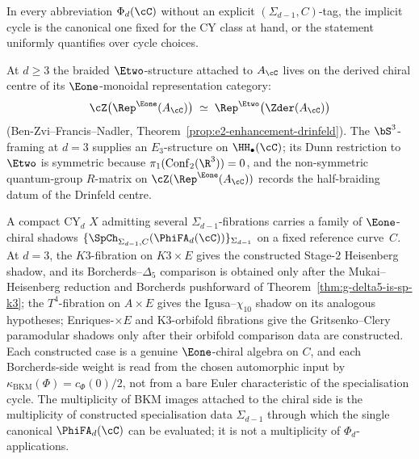 \begin{remark}
\begin{enumerate}[label=\textup{(\roman*)}]
\end{enumerate}
In every abbreviation $\Phi_d(\cC)$ without an explicit $(\Sigma_{d-1}, C)$-tag, the implicit cycle is the canonical one fixed for the CY class at hand, or the statement uniformly quantifies over cycle choices.
\end{remark}

\begin{remark}[Location of the braided \texorpdfstring{$\Etwo$}{E2} at \texorpdfstring{$d \geq 3$}{d >= 3}]
\label{rem:e2-on-drinfeld-centre}
At $d \geq 3$ the braided $\Etwo$-structure attached to $A_\cC$ lives on the derived chiral centre of its $\Eone$-monoidal representation category:
\[
 \cZ\bigl(\Rep^{\Eone}(A_\cC)\bigr) \;\simeq\; \Rep^{\Etwo}\bigl(\Zder(A_\cC)\bigr)
\]
(Ben-Zvi--Francis--Nadler, Theorem~\ref{prop:e2-enhancement-drinfeld}). The $\bS^3$-framing at $d = 3$ supplies an $E_3$-structure on $\HH_\bullet(\cC)$; its Dunn restriction to $\Etwo$ is symmetric because $\pi_1(\mathrm{Conf}_2(\R^3)) = 0$, and the non-symmetric quantum-group $R$-matrix on $\cZ(\Rep^{\Eone}(A_\cC))$ records the half-braiding datum of the Drinfeld centre.
\end{remark}

\begin{remark}
\label{rem:multiple-e1-specialisations}
A compact CY$_d$ $X$ admitting several $\Sigma_{d-1}$-fibrations carries a family of $\Eone$-chiral shadows
\(
 \{\SpCh_{\Sigma_{d-1}, C}(\PhiFA_d(\cC))\}_{\Sigma_{d-1}}
\)
on a fixed reference curve~$C$. At $d = 3$, the $K3$-fibration on $K3 \times E$ gives the constructed Stage-$2$ Heisenberg shadow, and its Borcherds--$\Delta_5$ comparison is obtained only after the Mukai--Heisenberg reduction and Borcherds pushforward of Theorem~\ref{thm:g-delta5-is-sp-k3}; the $T^4$-fibration on $A \times E$ gives the Igusa--$\chi_{10}$ shadow on its analogous hypotheses; Enriques-$\times E$ and K3-orbifold fibrations give the Gritsenko--Clery paramodular shadows only after their orbifold comparison data are constructed. Each constructed case is a genuine $\Eone$-chiral algebra on $C$, and each Borcherds-side weight is read from the chosen automorphic input by $\kappa_{\mathrm{BKM}}(\Phi)=c_\Phi(0)/2$, not from a bare Euler characteristic of the specialisation cycle. The multiplicity of BKM images attached to the chiral side is the multiplicity of constructed specialisation data $\Sigma_{d-1}$ through which the single canonical $\PhiFA_d(\cC)$ can be evaluated; it is not a multiplicity of $\Phi_d$-applications.
\end{remark}

